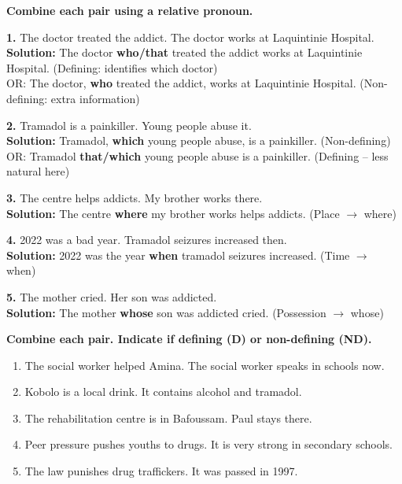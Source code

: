 \documentclass[11pt]{article}
\begin{document}
\begin{exoresolu}
\textbf{Combine each pair using a relative pronoun.}

\textbf{1.} The doctor treated the addict. The doctor works at Laquintinie Hospital.
\tcblower
\textbf{Solution:} The doctor \textbf{who/that} treated the addict works at Laquintinie Hospital. (Defining: identifies which doctor) \\
OR: The doctor, \textbf{who} treated the addict, works at Laquintinie Hospital. (Non-defining: extra information)

\textbf{2.} Tramadol is a painkiller. Young people abuse it.
\\[4pt]
\textbf{Solution:} Tramadol, \textbf{which} young people abuse, is a painkiller. (Non-defining) \\
OR: Tramadol \textbf{that/which} young people abuse is a painkiller. (Defining -- less natural here)

\textbf{3.} The centre helps addicts. My brother works there.
\\[4pt]
\textbf{Solution:} The centre \textbf{where} my brother works helps addicts. (Place $\rightarrow$ where)

\textbf{4.} 2022 was a bad year. Tramadol seizures increased then.
\\[4pt]
\textbf{Solution:} 2022 was the year \textbf{when} tramadol seizures increased. (Time $\rightarrow$ when)

\textbf{5.} The mother cried. Her son was addicted.
\\[4pt]
\textbf{Solution:} The mother \textbf{whose} son was addicted cried. (Possession $\rightarrow$ whose)
\end{exoresolu}

\begin{exercice}
\textbf{Combine each pair. Indicate if defining (D) or non-defining (ND).}
\begin{enumerate}
\item The social worker helped Amina. The social worker speaks in schools now.
\item Kobolo is a local drink. It contains alcohol and tramadol.
\item The rehabilitation centre is in Bafoussam. Paul stays there.
\item Peer pressure pushes youths to drugs. It is very strong in secondary schools.
\item The law punishes drug traffickers. It was passed in 1997.
\end{enumerate}
\end{exercice}
\end{document}
